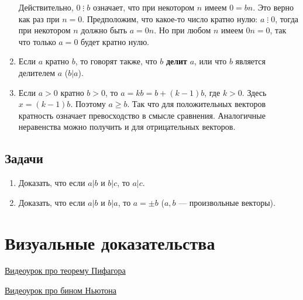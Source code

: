\begin{enumerate}
Действительно, $0\mathop{\vdots} b$ означает, что при некотором $n$ имеем $0=bn$. Это верно как раз при $n=0$. Предположим, что какое-то число кратно нулю: $a\mathop{\vdots} 0$, тогда при некотором $n$ должно быть $a=0n$. Но при любом $n$ имеем $0n=0$, так что только $a=0$ будет кратно нулю.

\item Если $a$ кратно $b$, то говорят также, что $b$ \textbf{делит} $a$, или что $b$ является делителем $a$ ($b|a$).
\item Если $a>0$ кратно $b>0$, то $a=kb=b+(k-1)b$, где $k>0$. Здесь $x=(k-1)b$. Поэтому $a\ge b$. Так что для положительных векторов кратность означает превосходство в смысле сравнения. Аналогичные неравенства можно получить и для отрицательных векторов.
\end{enumerate}
\subsection*{Задачи}
\begin{enumerate}
\item Доказать, что если $a|b$ и $b|c$, то $a|c$.
\item Доказать, что если $a|b$ и $b|a$, то $a=\pm b$ ($a,b$ --- произвольные векторы).
\end{enumerate}


\section{Визуальные доказательства}

\href{https://www.youtube.com/watch?v=Xdc8WWFURA8}{Видеоурок про теорему Пифагора}

\href{https://www.youtube.com/watch?v=YXYQmxLDtMw}{Видеоурок про бином Ньютона}

